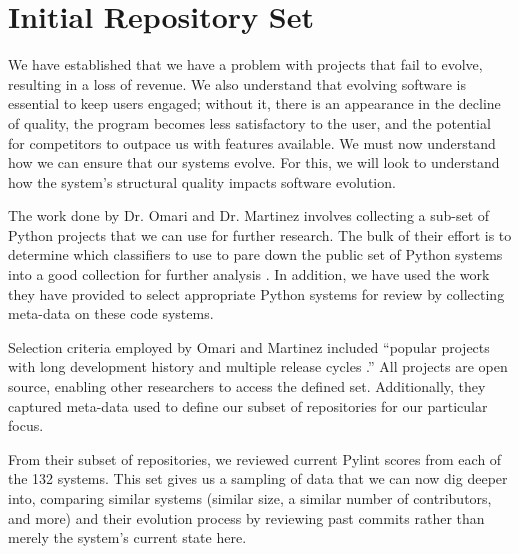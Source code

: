 \section{Initial Repository Set} \label{sectionInitialSet}

We have established that we have a problem with projects that fail to evolve, resulting in a loss of revenue. We also understand that evolving software is essential to keep users engaged; without it, there is an appearance in the decline of quality, the program becomes less satisfactory to the user, and the potential for competitors to outpace us with features available. We must now understand how we can ensure that our systems evolve. For this, we will look to understand how the system's structural quality impacts software evolution.

The work done by Dr. Omari and Dr. Martinez involves collecting a sub-set of Python projects that we can use for further research. The bulk of their effort is to determine which classifiers to use to pare down the public set of Python systems into a good collection for further analysis \cite{omari:2018}. In addition, we have used the work they have provided to select appropriate Python systems for review by collecting meta-data on these code systems.

Selection criteria employed by Omari and Martinez included ``popular projects with long development history and multiple release cycles \cite{omari:2018}.'' All projects are open source, enabling other researchers to access the defined set. Additionally, they captured meta-data used to define our subset of repositories for our particular focus.

From their subset of repositories, we reviewed current Pylint scores from each of the 132 systems. This set gives us a sampling of data that we can now dig deeper into, comparing similar systems (similar size, a similar number of contributors, and more) and their evolution process by reviewing past commits rather than merely the system's current state here.
